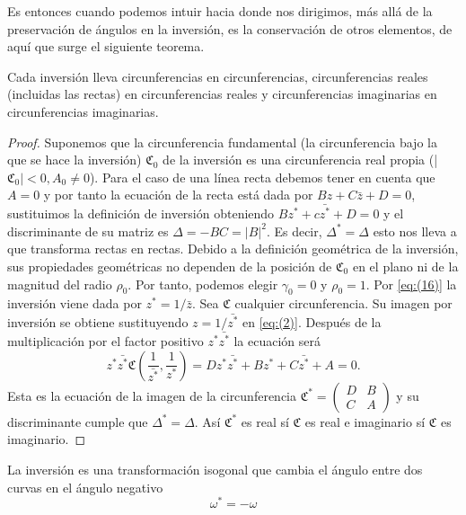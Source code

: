 \documentclass{matematicasud}
\begin{document}
Es entonces cuando podemos intuir hacia donde nos dirigimos, más allá de la preservación de ángulos en la inversión, es la conservación de otros elementos, de aquí que surge el siguiente teorema.

\begin{teorema}
    Cada inversión lleva circunferencias en circunferencias, circunferencias reales (incluidas las rectas) en circunferencias reales y circunferencias imaginarias en circunferencias imaginarias. 
\end{teorema}

\begin{proof}
    Suponemos que la circunferencia fundamental (la circunferencia bajo la que se hace la inversión) $\mathfrak{C}_0$ de la inversión es una circunferencia real propia (|$\mathfrak{C}_0|<0, A_0 \neq 0$). Para el caso de una línea recta debemos tener en cuenta que $A=0$ y por tanto la ecuación de la recta está dada por $Bz+C\bar{z}+D=0$, sustituimos la definición de inversión obteniendo $Bz^*+c\bar{z^*}+D=0$ y el discriminante de su matriz es $\Delta=-BC=|B|^2$. Es decir, $\Delta^*=\Delta$ esto nos lleva a que transforma rectas en rectas. Debido a la definición geométrica de la inversión, sus propiedades geométricas no dependen de la posición de $\mathfrak{C}_0$ en el plano ni de la magnitud del radio $\rho_0$. Por tanto, podemos elegir $\gamma_0=0$ y $\rho_0=1$. Por \eqref{eq:(16)} la inversión viene dada por $z^*=1/\bar{z}$. Sea $\mathfrak{C}$ cualquier circunferencia. Su imagen por inversión se obtiene sustituyendo $z=1/\bar{z^*}$ en \eqref{eq:(2)}. Después de la multiplicación por el factor positivo $z^*\bar{z^*}$ la ecuación será
    \begin{equation}
        z^*\bar{z^*}\mathfrak{C}\left(\frac{1}{\bar{z^*}},\frac{1}{z^*}\right)=Dz^*\bar{z^*}+Bz^*+C\bar{z^*}+A=0.
        \label{eq:(19)}
    \end{equation}
    Esta es la ecuación de la imagen de la circunferencia $\mathfrak{C}^*=\begin{pmatrix}
        D & B \\
        C & A
    \end{pmatrix}$  y su discriminante cumple que $\Delta^*=\Delta$. Así $\mathfrak{C^*}$ es real sí $\mathfrak{C}$ es real e imaginario sí $\mathfrak{C}$ es imaginario.
\end{proof}
    
\begin{teorema}
    La inversión es una transformación isogonal que cambia el ángulo entre dos curvas en el ángulo negativo
    \begin{equation}
        \omega^*=-\omega
        \label{eq:(20)}
    \end{equation}
\end{teorema}
\end{document}
